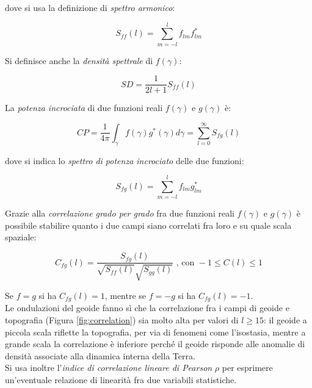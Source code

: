 \documentclass[a4paper,12pt]{book}
\begin{document}
\noindent
dove si usa la definizione di \textit{spettro armonico}:

\begin{equation}
    S_{ff} (l) = \sum _{m = - l}^lf_{lm} f^*_{lm}
\end{equation}

\noindent Si definisce anche la \textit{densità spettrale} di $f(\gamma)$:

\begin{equation}
    SD = \frac{1}{2l+1} S_{ff}(l)
\end{equation}

\noindent La \textit{potenza incrociata} di due funzioni reali $f(\gamma)$ e $g(\gamma)$ è:

\begin{equation}
    CP = \frac{1}{4 \pi} \int_\gamma f(\gamma) g^*(\gamma) d\gamma = \sum_{l=0}^\infty S_{fg}(l)
\end{equation}

\noindent
dove si indica lo \textit{spettro di potenza incrociato} delle due funzioni:

\begin{equation}
    S_{fg} (l) = \sum_{m=-l}^l f_{lm}g^*_{lm}
\end{equation}

\noindent Grazie alla \textit{correlazione grado per grado} fra due funzioni reali $f(\gamma)$ e $g(\gamma)$ è possibile stabilire quanto i due campi siano correlati fra loro e su quale scala spaziale:

\begin{equation}
    C_{fg} (l) = \frac{S_{fg} (l)}{\sqrt{S_{ff}(l)} \sqrt{S_{gg}(l)}} \text{ , con } -1 \le C(l) \le 1
\end{equation}

\noindent
Se $f = g$ si ha $C_{fg}(l) = 1$, mentre se $f = -g$ si ha $C_{fg}(l) = -1$.\\

\noindent
Le ondulazioni del geoide fanno sì che la correlazione fra i campi di geoide e topografia (Figura \ref{fig:correlation}) sia molto alta per valori di $l \ge 15$: il geoide a piccola scala riflette la topografia, per via di fenomeni come l'isostasia, mentre a grande scala la correlazione è inferiore perché il geoide risponde alle anomalie di densità associate alla dinamica interna della Terra.\\

\noindent
Si usa inoltre l'\textit{indice di correlazione lineare di Pearson} $\rho$ per esprimere un'eventuale relazione di linearità fra due variabili statistiche.
\end{document}
